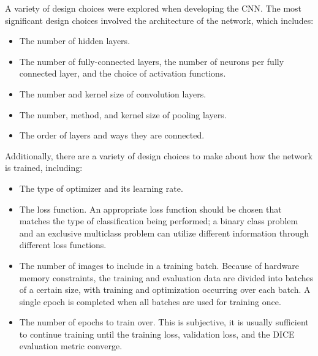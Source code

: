 A variety of design choices were explored when developing the CNN. The most significant design choices involved the architecture of the network, which includes: 
\begin{itemize}
    \item The number of hidden layers.
    \item The number of fully-connected layers, the number of neurons per fully connected layer, and the choice of activation functions.
    \item The number and kernel size of convolution layers.
    \item The number, method, and kernel size of pooling layers.
    \item The order of layers and ways they are connected.
\end{itemize}
Additionally, there are a variety of design choices to make about how the network is trained, including: 
\begin{itemize}
    \item The type of optimizer and its learning rate.
    \item The loss function. An appropriate loss function should be chosen that matches the type of classification being performed; a binary class problem and an exclusive multiclass problem can utilize different information through different loss functions. 
    \item The number of images to include in a training batch. Because of hardware memory constraints, the training and evaluation data are divided into batches of a certain size, with training and optimization occurring over each batch. A single epoch is completed when all batches are used for training once. 
    \item The number of epochs to train over. This is subjective, it is usually sufficient to continue training until the training loss, validation loss, and the DICE evaluation metric converge. 
\end{itemize}

